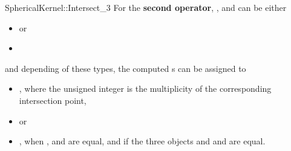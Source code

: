 \begin{ccRefFunctionObjectConcept}{SphericalKernel::Intersect_3}
For the \textbf{second operator}, ,  and 
can be either
\begin{itemize}
\item {}  or
\item {} 
\end{itemize}

and depending of these types, the computed s can be 
assigned to 
\begin{itemize}
\item {} ,
where the unsigned integer is the multiplicity of the corresponding
intersection point,
\item {}  or
\item {} , when ,  and  
are equal, and if the three objects  and  and 
are equal.
\end{itemize} 

\end{ccRefFunctionObjectConcept}
